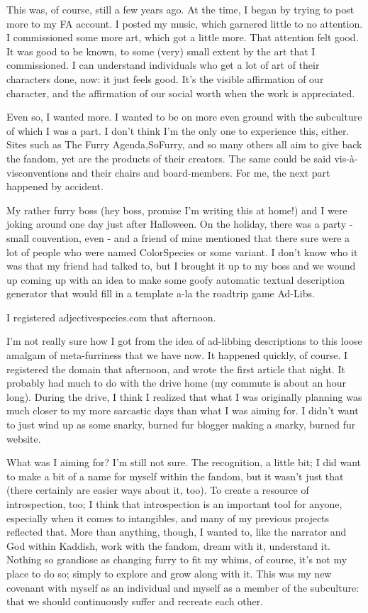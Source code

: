 This was, of course, still a few years ago. At the time, I began by trying to post more to my FA account. I posted my music, which garnered little to no attention. I commissioned some more art, which got a little more. That attention felt good. It was good to be known, to some (very) small extent by the art that I commissioned. I can understand individuals who get a lot of art of their characters done, now: it just feels good. It's the visible affirmation of our character, and the affirmation of our social worth when the work is appreciated.

Even so, I wanted more. I wanted to be on more even ground with the subculture of which I was a part. I don't think I'm the only one to experience this, either. Sites such as The Furry Agenda,SoFurry, and so many others all aim to give back the fandom, yet are the products of their creators. The same could be said vis-à-visconventions and their chairs and board-members. For me, the next part happened by accident.

My rather furry boss (hey boss, promise I'm writing this at home!) and I were joking around one day just after Halloween. On the holiday, there was a party - small convention, even - and a friend of mine mentioned that there sure were a lot of people who were named ColorSpecies or some variant. I don't know who it was that my friend had talked to, but I brought it up to my boss and we wound up coming up with an idea to make some goofy automatic textual description generator that would fill in a template a-la the roadtrip game Ad-Libs.

I registered adjectivespecies.com that afternoon.

I'm not really sure how I got from the idea of ad-libbing descriptions to this loose amalgam of meta-furriness that we have now. It happened quickly, of course. I registered the domain that afternoon, and wrote the first article that night. It probably had much to do with the drive home (my commute is about an hour long). During the drive, I think I realized that what I was originally planning was much closer to my more sarcastic days than what I was aiming for. I didn't want to just wind up as some snarky, burned fur blogger making a snarky, burned fur website.

What was I aiming for? I'm still not sure. The recognition, a little bit; I did want to make a bit of a name for myself within the fandom, but it wasn't just that (there certainly are easier ways about it, too). To create a resource of introspection, too; I think that introspection is an important tool for anyone, especially when it comes to intangibles, and many of my previous projects reflected that. More than anything, though, I wanted to, like the narrator and God within Kaddish, work with the fandom, dream with it, understand it. Nothing so grandiose as changing furry to fit my whims, of course, it's not my place to do so; simply to explore and grow along with it. This was my new covenant with myself as an individual and myself as a member of the subculture: that we should continuously suffer and recreate each other.
